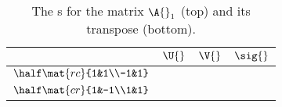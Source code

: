 \clearpage
\thispagestyle{empty}
\begin{landscape}
\begin{table}[htdp]
\caption[The \asvd s for the matrix $\A{}_{1}$]{The \asvd s for the matrix $\A{}_{1}$ (top) and its transpose (bottom).}
\begin{center}
\begin{tabular}{lccc}
%
  &$\U{}$ & \quad $\V{}$ & \quad $\sig{}$ \\[10pt]\hline
%
 $\half \mat{rc}{1&1\\-1&1}$ \qquad &
\raisebox{-0.5\height}{\includegraphics[ width = 1.5in ] {images/bases/pies/"A1 U"}}  & \quad
\raisebox{-0.5\height}{\includegraphics[ width = 1.5in ] {images/bases/pies/"A1 V"}} & \quad
\raisebox{-0.5\height}{\includegraphics[ width = 1.5in ] {images/bases/pies/"A1 S"}} \\[10pt]
%
 $\half \mat{cr}{1&-1\\1&1}$ &
\raisebox{-0.5\height}{\includegraphics[ width = 1.5in ] {images/bases/pies/"A1T U"}}  & \quad
\raisebox{-0.5\height}{\includegraphics[ width = 1.5in ] {images/bases/pies/"A1T V"}} & \quad
\raisebox{-0.5\height}{\includegraphics[ width = 1.5in ] {images/bases/pies/"A1  S"}}
%
\end{tabular}
\end{center}
\label{tab:pie:a1}
\end{table}
\end{landscape}

\endinput